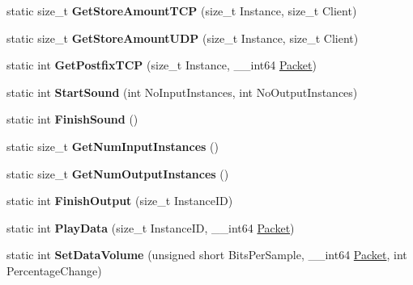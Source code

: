 \begin{DoxyCompactItemize}
\item 
\hypertarget{structmn_c_l_r_ad05ce0647b767743575334b1530f4486}{
static size\_\-t {\bfseries GetStoreAmountTCP} (size\_\-t Instance, size\_\-t Client)}
\label{structmn_c_l_r_ad05ce0647b767743575334b1530f4486}

\item 
\hypertarget{structmn_c_l_r_af18ec4dcf40bb01e503393cd398296d0}{
static size\_\-t {\bfseries GetStoreAmountUDP} (size\_\-t Instance, size\_\-t Client)}
\label{structmn_c_l_r_af18ec4dcf40bb01e503393cd398296d0}

\item 
\hypertarget{structmn_c_l_r_a925adcc9ca01be3deec1766466f8e1f4}{
static int {\bfseries GetPostfixTCP} (size\_\-t Instance, \_\-\_\-int64 \hyperlink{class_packet}{Packet})}
\label{structmn_c_l_r_a925adcc9ca01be3deec1766466f8e1f4}

\item 
\hypertarget{structmn_c_l_r_a7673e2374e5d5170e9bca64544fba6f1}{
static int {\bfseries StartSound} (int NoInputInstances, int NoOutputInstances)}
\label{structmn_c_l_r_a7673e2374e5d5170e9bca64544fba6f1}

\item 
\hypertarget{structmn_c_l_r_a7ae3aa04c8711a68a08620142558f7c0}{
static int {\bfseries FinishSound} ()}
\label{structmn_c_l_r_a7ae3aa04c8711a68a08620142558f7c0}

\item 
\hypertarget{structmn_c_l_r_afdedac451edca66a19c5f9f1f2875478}{
static size\_\-t {\bfseries GetNumInputInstances} ()}
\label{structmn_c_l_r_afdedac451edca66a19c5f9f1f2875478}

\item 
\hypertarget{structmn_c_l_r_af930bd042db06c3915830a96a33c90f0}{
static size\_\-t {\bfseries GetNumOutputInstances} ()}
\label{structmn_c_l_r_af930bd042db06c3915830a96a33c90f0}

\item 
\hypertarget{structmn_c_l_r_a982c8ec4740bfaf2c875f830f36462ed}{
static int {\bfseries FinishOutput} (size\_\-t InstanceID)}
\label{structmn_c_l_r_a982c8ec4740bfaf2c875f830f36462ed}

\item 
\hypertarget{structmn_c_l_r_abdff18edef3d813866a50bd853cddc0f}{
static int {\bfseries PlayData} (size\_\-t InstanceID, \_\-\_\-int64 \hyperlink{class_packet}{Packet})}
\label{structmn_c_l_r_abdff18edef3d813866a50bd853cddc0f}

\item 
\hypertarget{structmn_c_l_r_abaef2322ecec24fbcfd426b1ed912e4d}{
static int {\bfseries SetDataVolume} (unsigned short BitsPerSample, \_\-\_\-int64 \hyperlink{class_packet}{Packet}, int PercentageChange)}
\label{structmn_c_l_r_abaef2322ecec24fbcfd426b1ed912e4d}


\end{DoxyCompactItemize}
